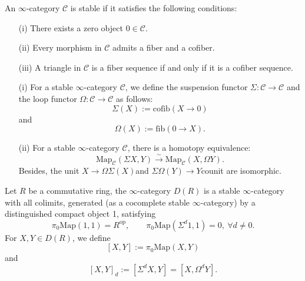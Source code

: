 \documentclass[UTF8,12,a4paper]{ctexart}
\theoremstyle{definition}
\begin{document}
\dfn 
An $\infty$-category $\mathcal{C}$ is stable if it satisfies the following conditions:
\begin{itemize}
	\item [(i)] There exists a zero object $0\in\mathcal{C}$.
	\item [(ii)] Every morphism in $\mathcal{C}$ admits a fiber and a cofiber.
	\item [(iii)] A triangle in $\mathcal{C}$ is a fiber sequence if and only if it is a cofiber sequence.
\end{itemize}
\rem
\begin{itemize}
	\item [(i)]For a stable $\infty$-category $\mathcal{C}$, we define the suspension functor $\Sigma:\mathcal{C}\longrightarrow\mathcal{C}$ and the loop functor $\Omega:\mathcal{C}\longrightarrow\mathcal{C}$ as follows:
	$$\Sigma(X):=\text{cofib}(X\longrightarrow 0)$$
	and
	$$\Omega(X):=\text{fib}(0\longrightarrow X).$$
	\item [(ii)]For a stable $\infty$-category $\mathcal{C}$, there is a homotopy equivalence:
	$$\text{Map}_\mathcal{C}(\Sigma X,Y)\stackrel{\sim}{\longrightarrow}\text{Map}_\mathcal{C}( X,\Omega Y).$$
	Besides, the unit $X\longrightarrow \Omega\Sigma(X)$and $\Sigma\Omega(Y) \longrightarrow Y$counit are isomorphic.
\end{itemize}
\dfn 
Let $R$ be a commutative ring, the $\infty$-category $D(R)$ is a stable $\infty$-category with all colimits, generated (as a cocomplete stable $\infty$-category) by a distinguished compact object 1, satisfying
$$
\pi_0\text{Map}(1,1)=R^{\text{op}},\quad\quad \pi_0\text{Map}(\Sigma^d 1,1)=0,\ \forall d\neq 0.
$$
For $X,Y\in D(R)$, we define
$$
[X,Y]:=\pi_0\text{Map}(X,Y)
$$
and 
$$[X,Y]_d:=[\Sigma^d X,Y]=[X,\Omega^d Y].$$
\rem
\end{document}
